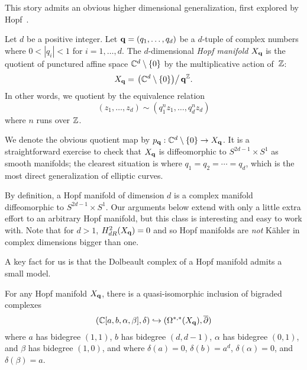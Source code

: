 This story admits an obvious higher dimensional generalization, first explored by Hopf~\cite{Hopf}.

\begin{dfn}
Let $d$ be a positive integer.
Let ${\bf q} = (q_1,\ldots, q_d)$ be a $d$-tuple of complex numbers where $0 < |q_i| < 1$ for $i = 1, \ldots, d$. 
The $d$-dimensional {\em Hopf manifold} $X_{\bf q}$ is the quotient of punctured affine space $\mathbb C^d \setminus \{0\}$ by the multiplicative action of~$\mathbb Z$:
\[
X_{\bf q} = \left. \left(\mathbb C^d \setminus \{0\}\right) \right/ {\bf q}^\mathbb Z.  
\]
In other words, we quotient by the equivalence relation
\[
(z_1,\ldots,z_d) \sim (q_1^{n} z_1, \ldots,q_d^{n} z_d)
\]
where $n$ runs over $\mathbb Z$.
\end{dfn}


We denote the obvious quotient map by $p_{\bf q} : \mathbb C^d \setminus \{0\} \to X_{\bf q}$. 
It is a straightforward exercise to check that $X_{\bf q}$ is diffeomorphic to $S^{2d-1} \times S^1$ as smooth manifolds;
the clearest situation is where $q_1 = q_2 = \cdots = q_d$,
which is the most direct generalization of elliptic curves.

\begin{rmk}
By definition, a Hopf manifold of dimension $d$ is a complex manifold diffeomorphic to $S^{2d-1} \times S^1$. 
Our arguments below extend with only a little extra effort to an arbitrary Hopf manifold, 
but this class is interesting and easy to work with.
Note that for $d>1$, $H^{2}_{dR} (X_{\bf q}) = 0$ and so Hopf manifolds are {\em not} K\"{a}hler in complex dimensions bigger than one. 
\end{rmk}

A key fact for us is that the Dolbeault complex of a Hopf manifold admits a small model.

\begin{lem}\label{lem:tanre}
For any Hopf manifold $X_{\bf q}$, there is a quasi-isomorphic inclusion of bigraded complexes
\[
(\mathbb C[a, b, \alpha, \beta], \delta) \hookrightarrow (\Omega^{*,*}(X_{\bf q}),\overline{\partial})
\]
where $a$ has bidegree $(1,1)$, $b$ has bidegree $(d,d-1)$, $\alpha$ has bidegree $(0,1)$, and $\beta$ has bidegree $(1,0)$, and where $\delta(a) = 0$, $\delta(b) = a^{d}$, $\delta(\alpha) = 0$, and $\delta(\beta) = a$.
\end{lem}

